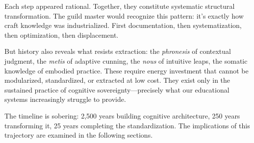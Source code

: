 Each step appeared rational. Together, they constitute systematic structural transformation. The guild master would recognize this pattern: it's exactly how craft knowledge was industrialized. First documentation, then systematization, then optimization, then displacement.

But history also reveals what resists extraction: the \textit{phronesis} of contextual judgment, the \textit{metis} of adaptive cunning, the \textit{nous} of intuitive leaps, the somatic knowledge of embodied practice. These require energy investment that cannot be modularized, standardized, or extracted at low cost. They exist only in the sustained practice of cognitive sovereignty---precisely what our educational systems increasingly struggle to provide.

The timeline is sobering: 2,500 years building cognitive architecture, 250 years transforming it, 25 years completing the standardization. The implications of this trajectory are examined in the following sections.

%
%
%
